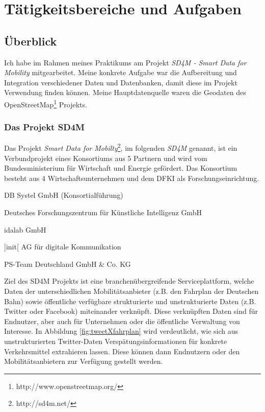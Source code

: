 \chapter{Tätigkeitsbereiche und Aufgaben}
\label{sec:main}
\section{Überblick}
\label{sec:main:overview}
Ich habe im Rahmen meines Praktikums am Projekt \textit{SD4M - Smart Data for Mobility} mitgearbeitet.
Meine konkrete Aufgabe war die Aufbereitung und Integration verschiedener Daten und Datenbanken, damit diese im Projekt Verwendung finden können. Meine Hauptdatenquelle waren die Geodaten des OpenStreetMap\footnote{http://www.openstreetmap.org/} Projekts.
\subsection{Das Projekt SD4M}
\label{sec:main:overview:sd4m}
Das Projekt \textit{Smart Data for Mobilty}\footnote{http://sd4m.net/}, im folgenden \textit{SD4M} genannt, ist ein Verbundprojekt eines Konsortiums aus 5 Partnern und wird vom Bundesministerium für Wirtschaft und Energie gefördert.
Das Konsortium besteht aus 4 Wirtschaftsunternehmen und dem DFKI als Forschungseinrichtung.
\begin{compactitem}
  \item DB Systel GmbH (Konsortialführung)
  \item Deutsches Forschungszentrum für Künstliche Intelligenz GmbH
  \item idalab GmbH
  \item ]init[ AG für digitale Kommunikation
  \item PS-Team Deutschland GmbH & Co. KG
\end{compactitem}
Ziel des SD4M Projekts ist eine branchenübergreifende Serviceplattform, welche Daten der unterschiedlichen Mobilitätsanbieter (z.B. den Fahrplan der Deutschen Bahn) sowie öffentliche verfügbare strukturierte und unstrukturierte Daten (z.B. Twitter oder Facebook) miteinander verknüpft.
Diese verknüpften Daten sind für Endnutzer, aber auch für Unternehmen oder die öffentliche Verwaltung von Interesse.
In Abbildung \ref{fig:tweetXfahrplan} wird verdeutlicht, wie sich aus unstrukturierten Twitter-Daten Verspätungsinformationen für konkrete Verkehrsmittel extrahieren lassen.
Diese können dann Endnutzern oder den Mobilitätsanbietern zur Verfügung gestellt werden.
